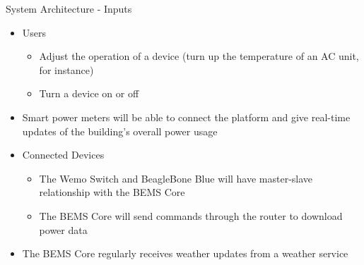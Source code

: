 \documentclass{beamer}
\begin{document}
\begin{frame}{System Architecture - Inputs}{}
    \begin{itemize}
        \item Users
            \begin{itemize}
                \item Adjust the operation of a device (turn up the temperature of an AC unit, for instance)
                \item Turn a device on or off
            \end{itemize}
        \item Smart power meters will be able to connect the platform and give real-time updates of the building's overall power usage
        \item Connected Devices
            \begin{itemize}
                \item The Wemo Switch and BeagleBone Blue will have master-slave relationship with the BEMS Core
                \item The BEMS Core will send commands through the router to download power data
            \end{itemize}
        \item The BEMS Core regularly receives weather updates from a weather service
    \end{itemize}
\end{frame}
\end{document}
